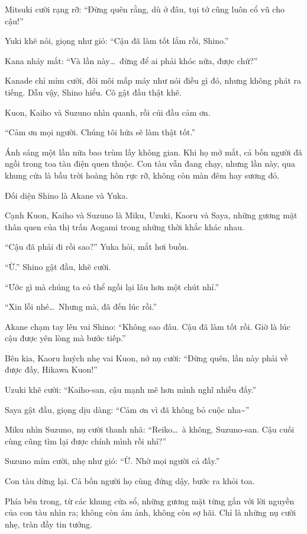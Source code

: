 \documentclass[../main.tex]{subfiles}
\begin{document}
Mitsuki cười rạng rỡ: ``Đừng quên rằng, dù ở đâu, tụi tớ cũng luôn cổ vũ cho cậu!''

Yuki khẽ nói, giọng như gió: ``Cậu đã làm tốt lắm rồi, Shino.''

Kana nháy mắt: ``Và lần này\dots\ đừng để ai phải khóc nữa, được chứ?''

Kanade chỉ mỉm cười, đôi môi mấp máy như nói điều gì đó, nhưng không phát ra tiếng. Dẫu vậy, Shino hiểu. Cô gật đầu thật khẽ.

Kuon, Kaiho và Suzuno nhìn quanh, rồi cúi đầu cảm ơn.

``Cảm ơn mọi người. Chúng tôi hứa sẽ làm thật tốt.''

Ánh sáng một lần nữa bao trùm lấy không gian. Khi họ mở mắt, cả bốn người đã ngồi trong toa tàu điện quen thuộc. Con tàu vẫn đang chạy, nhưng lần này, qua khung cửa là bầu trời hoàng hôn rực rỡ, không còn màn đêm hay sương đỏ.


Đối diện Shino là Akane và Yuka.

Cạnh Kuon, Kaiho và Suzuno là Miku, Uzuki, Kaoru và Saya, những gương mặt thân quen của thị trấn Aogami trong những thời khắc khác nhau.

``Cậu đã phải đi rồi sao?'' Yuka hỏi, mắt hơi buồn.

``Ừ.'' Shino gật đầu, khẽ cười.

``Ước gì mà chúng ta có thể ngồi lại lâu hơn một chút nhỉ.''

``Xin lỗi nhé\dots\ Nhưng mà, đã đến lúc rồi.''

Akane chạm tay lên vai Shino: ``Không sao đâu. Cậu đã làm tốt rồi. Giờ là lúc cậu được yên lòng mà bước tiếp.''

Bên kia, Kaoru huých nhẹ vai Kuon, nở nụ cười: ``Đừng quên, lần này phải về được đấy, Hikawa Kuon!''

Uzuki khẽ cười: ``Kaiho-san, cậu mạnh mẽ hơn mình nghĩ nhiều đấy.''

Saya gật đầu, giọng dịu dàng: ``Cảm ơn vì đã không bỏ cuộc nha\~{}''

Miku nhìn Suzuno, nụ cười thanh nhã: ``Reiko\dots\ à không, Suzuno-san. Cậu cuối cùng cũng tìm lại được chính mình rồi nhỉ?''

Suzuno mỉm cười, nhẹ như gió: ``Ừ. Nhờ mọi người cả đấy.''

Con tàu dừng lại. Cả bốn người họ cùng đứng dậy, bước ra khỏi toa.

Phía bên trong, từ các khung cửa sổ, những gương mặt từng gắn với lời nguyền của con tàu nhìn ra; không còn ám ảnh, không còn sợ hãi. Chỉ là những nụ cười nhẹ, tràn đầy tin tưởng.
\end{document}

